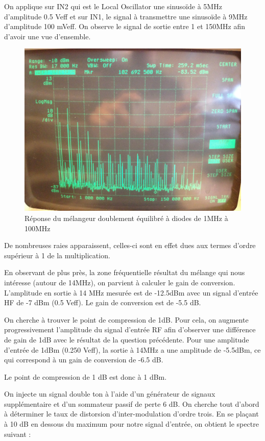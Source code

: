 \documentclass{article}
\begin{document}

On applique sur IN2 qui est le Local Oscillator une sinusoïde à 5MHz d’amplitude  0.5 Veff et sur IN1, le signal à transmettre une sinusoïde à 9MHz d'amplitude 100 mVeff.
On observe le signal de sortie entre 1 et 150MHz afin d'avoir une vue d'ensemble.

\begin{figure}[h!]
	\centering
	\includegraphics[width=.7\textwidth]{9_3_1}
	\caption{Réponse du mélangeur doublement équilibré à diodes de 1MHz à 100MHz}
	\label{fig:9_3_1}
\end{figure}


De nombreuses raies apparaissent, celles-ci sont en effet dues aux termes d'ordre supérieur à 1 de la multiplication.


En observant de plus près, la zone fréquentielle résultat du mélange qui nous intéresse (autour de 14MHz), on parvient à calculer le gain de conversion.
L'amplitude en sortie à 14 MHz mesurée est de -12.5dBm avec un signal d'entrée HF de -7 dBm (0.5 Veff).
Le gain de conversion est de -5.5 dB.


On cherche à trouver le point de compression de 1dB. Pour cela, on augmente progressivement l'amplitude du signal d'entrée RF afin d'observer une différence de gain de 1dB avec le résultat de la question précédente.
Pour une amplitude d'entrée de 1dBm (0.250 Veff), la sortie à 14MHz a une amplitude de -5.5dBm, ce qui correspond à un gain de  conversion de -6.5 dB.

Le point de compression de 1 dB est donc à 1 dBm.


On injecte un signal double ton à l'aide d'un générateur de signaux supplémentaire et d'un sommateur passif de perte 6 dB.
On cherche tout d'abord à déterminer le taux de distorsion d'inter-modulation d'ordre trois.
En se plaçant à 10 dB en dessous du maximum pour notre signal d'entrée, on obtient le spectre suivant :
\end{document}
